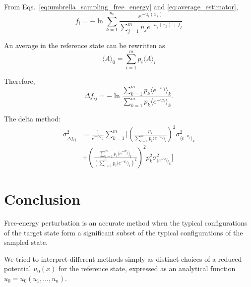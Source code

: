 \documentclass[aip,jcp,preprint,amsmath,amssymb]{revtex4-1}
\begin{document}
From Eqs.~\eqref{eq:umbrella_sampling_free_energy} and \eqref{eq:average_estimator},
\begin{equation*}
f_i = -\ln \sum_{k=1}^{n_0} \frac{e^{-u_i(x_k)}}{\sum_{j=1}^m n_j e^{-u_j(x_k) + f_j}}
\end{equation*}

An average in the reference state can be rewritten as
\begin{equation}
\label{eq:average_reference_state}
\langle A \rangle_0 = \sum_{i=1}^m p_i \langle A \rangle_i
\end{equation}

Therefore,
\begin{equation*}
\label{eq:mbar_free_energy_difference}
\Delta f_{ij} = - \ln \frac{\sum_{k=1}^m p_k \langle e^{-w_j} \rangle_k}{\sum_{k=1}^m p_k \langle e^{-w_i} \rangle_k}.
\end{equation*}

The delta method:
\begin{align*}
\sigma^2_{\Delta \hat f_{ij}} &= \frac{1}{e^{-\Delta f_{ij}}} \sum_{k=1}^m \Bigg[ \left(\frac{p_k}{\sum_{l=1}^m p_l \langle e^{-w_i} \rangle_l } \right)^2 \sigma^2_{\langle e^{-w_j} \rangle_k} \\
&+ \left( \frac{\sum_{l=1}^m p_l \langle e^{-w_j} \rangle_l}{(\sum_{l=1}^m p_l \langle e^{-w_i} \rangle_l)^2}\right)^2 p_k^2 \sigma^2_{\langle e^{-w_i} \rangle_k} \Bigg]
\end{align*}

\section{Conclusion}

Free-energy perturbation is an accurate method when the typical configurations of the target state form a significant subset of the typical configurations of the sampled state.

We tried to interpret different methods simply as distinct choices of a reduced potential $u_0(x)$ for the reference state, expressed as an analytical function $u_0 = u_0(u_1,\dots,u_n)$.


\end{document}
